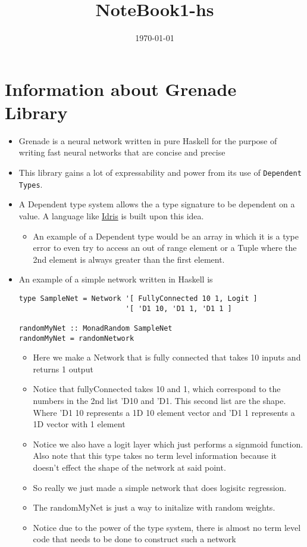 \documentclass{article}
\date{\today}
\title{NoteBook1-hs}
\begin{document}
\maketitle
\tableofcontents

\section{Information about Grenade Library}
\label{sec-1}
\begin{itemize}
\item Grenade is a neural network written in pure Haskell for the purpose
of writing fast neural networks that are concise and precise
\item This library gains a lot of expressability and power from its use of
\texttt{Dependent Types}.
\item A Dependent type system allows the a type signature to be dependent
on a value. A language like \href{https://www.idris-lang.org/}{Idris} is built upon this idea.
\begin{itemize}
\item An example of a Dependent type would be an array in which it is a
type error to even try to access an out of range element or a
Tuple where the 2nd element is always greater than the first
element.
\end{itemize}
\item An example of a simple network written in Haskell is
\begin{verbatim}
type SampleNet = Network '[ FullyConnected 10 1, Logit ]
                         '[ 'D1 10, 'D1 1, 'D1 1 ]

randomMyNet :: MonadRandom SampleNet
randomMyNet = randomNetwork
\end{verbatim}
\begin{itemize}
\item Here we make a Network that is fully connected that takes 10
inputs and returns 1 output
\item Notice that fullyConnected takes 10 and 1, which correspond to the
numbers in the 2nd list 'D10 and 'D1. This second list are the
shape. Where 'D1 10 represents a 1D 10 element vector and 'D1 1
represents a 1D vector with 1 element
\item Notice we also have a logit layer which just performs a signmoid
function. Also note that this type takes no term level
information because it doesn't effect the shape of the network at
said point.
\item So really we just made a simple network that does logisitc
regression.
\item The randomMyNet is just a way to initalize with random weights.
\item Notice due to the power of the type system, there is almost no
term level code that needs to be done to construct such a network
\end{itemize}


\end{itemize}
\end{document}

